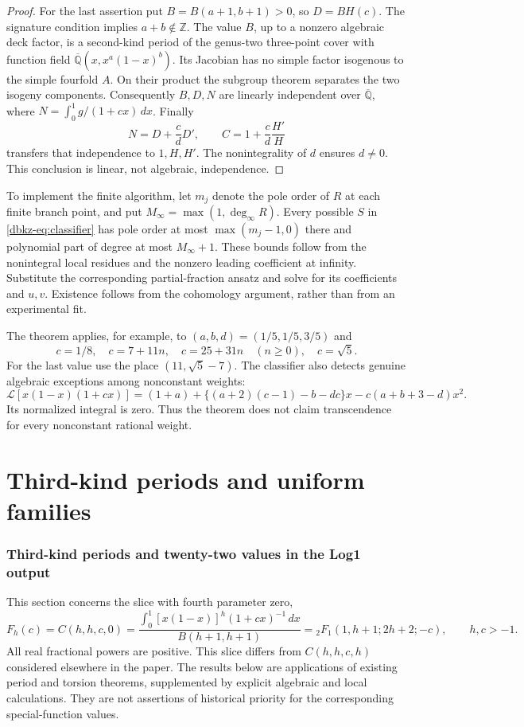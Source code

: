 \documentclass[11pt,a4paper]{article}
\theoremstyle{definition}
\theoremstyle{remark}
\numberwithin{equation}{section}
\begin{document}
\begin{proof}
For the last assertion put $B=B(a+1,b+1)>0$, so $D=BH(c)$.
The signature condition implies $a+b\notin\mathbb Z$.
The value $B$, up to a nonzero algebraic deck factor, is a second-kind
period of the genus-two three-point cover with function field
$\overline{\mathbb Q}(x,x^a(1-x)^b)$. Its Jacobian has no simple
factor isogenous to the simple fourfold $A$. On their product the
subgroup theorem separates the two isogeny components. Consequently
$B,D,N$ are linearly independent over $\overline{\mathbb Q}$, where
$N=\int_0^1g/(1+cx)\,dx$. Finally
\[
 N=D+\frac cd D',\qquad C=1+\frac cd\frac{H'}H
\]
transfers that independence to $1,H,H'$. The nonintegrality of $d$
ensures $d\ne0$. This conclusion is linear, not algebraic,
independence.
\end{proof}

To implement the finite algorithm, let $m_j$ denote the pole order of
$R$ at each finite branch point, and put
$M_\infty=\max(1,\deg_\infty R)$.
Every possible $S$ in \eqref{dbkz-eq:classifier} has pole order at most
$\max(m_j-1,0)$ there and polynomial part of degree at most
$M_\infty+1$. These bounds follow from the nonintegral local residues
and the nonzero leading coefficient at infinity. Substitute the
corresponding partial-fraction ansatz and solve for its coefficients
and $u,v$. Existence follows from the cohomology argument, rather than
from an experimental fit.

The theorem applies, for example, to $(a,b,d)=(1/5,1/5,3/5)$ and
\[
 c=1/8,\quad c=7+11n,\quad c=25+31n\quad(n\ge0),\quad c=\sqrt5.
\]
For the last value use the place $(11,\sqrt5-7)$.
The classifier also detects genuine algebraic exceptions among
nonconstant weights:
\[
 \mathcal L[x(1-x)(1+cx)]
 =(1+a)+\{(a+2)(c-1)-b-dc\}x-c(a+b+3-d)x^2.
\]
Its normalized integral is zero. Thus the theorem does not claim
transcendence for every nonconstant rational weight.

\clearpage

\part{Third-kind periods and uniform families}
\section{Third-kind periods and twenty-two values in the Log1 output}
\label{log1-section}

This section concerns the slice with fourth parameter zero,
\begin{equation}\label{log1-definition}
 F_h(c)=C(h,h,c,0)
 =\frac{\displaystyle\int_0^1[x(1-x)]^h(1+cx)^{-1}\,dx}
 {B(h+1,h+1)}
 ={}_2F_1(1,h+1;2h+2;-c),\qquad h,c>-1.
\end{equation}
All real fractional powers are positive. This slice differs from
$C(h,h,c,h)$ considered elsewhere in the paper. The results below are
applications of existing period and torsion theorems, supplemented by
explicit algebraic and local calculations. They are not assertions of
historical priority for the corresponding special-function values.
\end{document}
